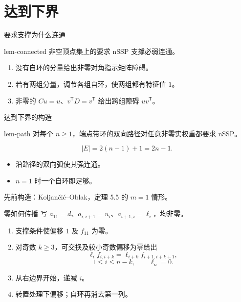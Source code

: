 \documentclass{beamer}
\begin{document}
\section{达到下界}
\begin{frame}{要求支撑为什么连通}
\begin{bookresult}{lem-connected}
非空顶点集上的要求 nSSP 支撑必弱连通。
\end{bookresult}
\begin{enumerate}
\item 没有自环的分量给出非零对角指示矩阵障碍。
\item 若有两组分量，调节各组自环，使两组都有特征值 $1$。
\item 非零的 $Cu=u$、$v^{\mathsf T}D=v^{\mathsf T}$ 给出跨组障碍 $uv^{\mathsf T}$。
\end{enumerate}
\end{frame}
\begin{frame}{达到下界的构造}
\begin{bookresult}{lem-path}
对每个 $n\geq1$，端点带环的双向路径对任意非零实权重都要求 nSSP。
\end{bookresult}
\[
 |E|=2(n-1)+1=2n-1.
\]
\begin{itemize}
\item 沿路径的双向弧使其强连通。
\item $n=1$ 时一个自环即足够。
\end{itemize}
\small 先前构造：Koljančić--Oblak，定理 5.5 的 $m=1$ 情形。
\end{frame}
\begin{frame}{零如何传播}
写 $a_{11}=d$、$a_{i,i+1}=u_i$、$a_{i+1,i}=\ell_i$，均非零。
\begin{enumerate}
\item 支撑条件使偏移 $1$ 及 $f_{11}$ 为零。
\item 对奇数 $k\geq3$，可交换及较小奇数偏移为零给出
\[
 \ell_i f_{i,i+k}=\ell_{i+k}f_{i+1,i+k+1},
\]
\[
 1\leq i\leq n-k,\qquad \ell_n=0.
\]
\item 从右边界开始，递减 $i$。
\item 转置处理下偏移；自环再消去第一列。
\end{enumerate}
\end{frame}
\end{document}
